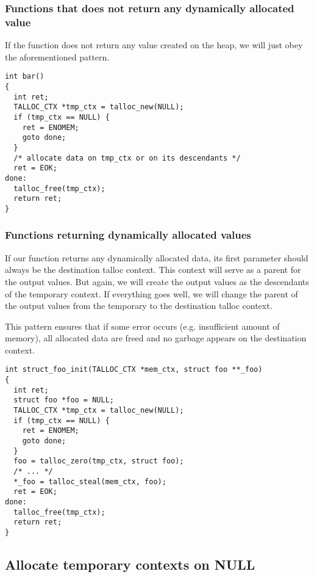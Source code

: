 \subsubsection{Functions that does not return any dynamically allocated value}

If the function does not return any value created on the heap, we will just obey
the aforementioned pattern.

\begin{lstlisting}[caption={Temporary context \#1},label=lst:tmp-ctx-1]
int bar()
{
  int ret;
  TALLOC_CTX *tmp_ctx = talloc_new(NULL);
  if (tmp_ctx == NULL) {
    ret = ENOMEM;
    goto done;
  }
  /* allocate data on tmp_ctx or on its descendants */
  ret = EOK;
done:
  talloc_free(tmp_ctx);
  return ret;
}
\end{lstlisting}

\subsubsection{Functions returning dynamically allocated values}

If our function returns any dynamically allocated data, its first parameter
should always be the destination talloc context. This context will serve
as a parent for the output values. But again, we will create the output values
as the descendants of the temporary context. If everything goes well, we will
change the parent of the output values from the temporary to the destination
talloc context.

This pattern ensures that if some error occurs (e.g. insufficient amount of
memory), all allocated data are freed and no garbage appears on the destination
context.

\begin{lstlisting}[caption={Temporary context \#2},label=lst:tmp-ctx-2]
int struct_foo_init(TALLOC_CTX *mem_ctx, struct foo **_foo)
{
  int ret;
  struct foo *foo = NULL;
  TALLOC_CTX *tmp_ctx = talloc_new(NULL);
  if (tmp_ctx == NULL) {
    ret = ENOMEM;
    goto done;
  }
  foo = talloc_zero(tmp_ctx, struct foo);
  /* ... */
  *_foo = talloc_steal(mem_ctx, foo);
  ret = EOK;
done:
  talloc_free(tmp_ctx);
  return ret;
}
\end{lstlisting}

\subsection{Allocate temporary contexts on NULL}
\label{talloc:subsec:tmp-ctx-on-null}

